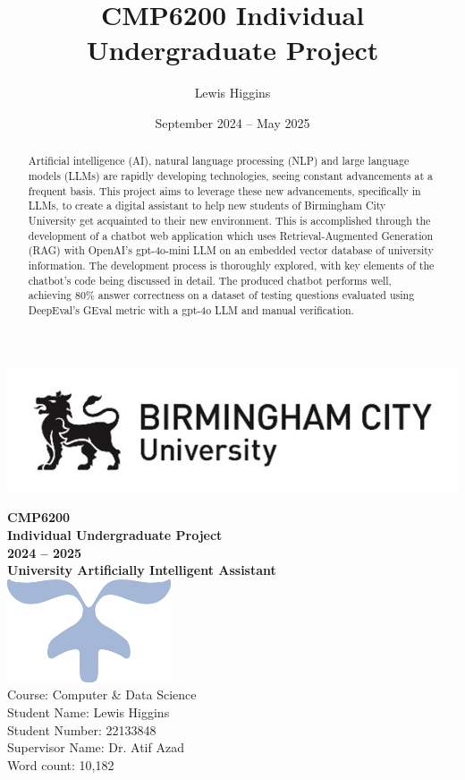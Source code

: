 \documentclass[12pt]{report}
\title{CMP6200 Individual Undergraduate Project}
\author{Lewis Higgins}
\date{September 2024 – May 2025}
\begin{document}
\makeatletter
\begin{titlepage}
    \includegraphics[width=0.3\linewidth]{BCUWide.jpg}\\[4ex]
    \vspace{1cm}
    \begin{center}
        {\huge \bfseries  CMP6200}\\[2ex]
        {\huge \bfseries  Individual Undergraduate Project}\\[2ex]
        {\huge \bfseries 2024 – 2025}\\[16ex]
        {\huge \bfseries University Artificially Intelligent Assistant}\\[6ex]
        \includegraphics[width=0.1\linewidth]{Symbol.png}\\[40ex]
        Course: Computer \& Data Science\\
        Student Name: Lewis Higgins\\
        Student Number: 22133848\\
        Supervisor Name: Dr. Atif Azad\\
        Word count: 10,182
    \end{center}
\end{titlepage}
\makeatother
\thispagestyle{empty}
\newpage

\begin{abstract}
    Artificial intelligence (AI), natural language processing (NLP) and large language models (LLMs) are
    rapidly developing technologies, seeing constant advancements at a frequent basis.
    This project aims to leverage these new advancements, specifically in LLMs, to create a digital assistant 
    to help new students of Birmingham City University get acquainted to their new environment. This is accomplished 
    through the development of a chatbot web application which uses Retrieval-Augmented Generation (RAG) with 
    OpenAI's gpt-4o-mini LLM on an embedded vector database of university information. The development process 
    is thoroughly explored, with key elements of the chatbot's code being discussed in detail.
    The produced chatbot performs well, achieving 80\% answer correctness on a dataset of testing questions
    evaluated using DeepEval's GEval metric with a gpt-4o LLM and manual verification.
\end{abstract}
\end{document}
